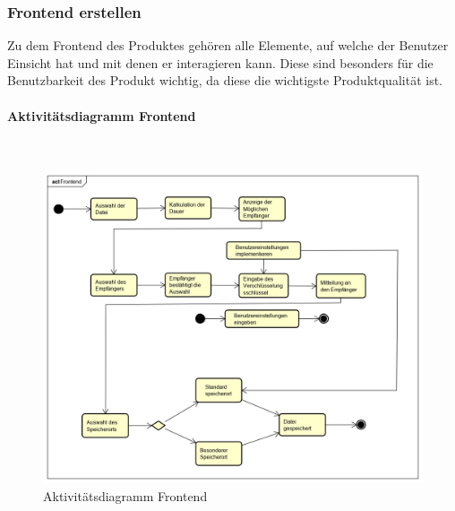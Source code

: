 \subsubsection{Frontend erstellen}
Zu dem Frontend des Produktes gehören alle Elemente, auf welche der Benutzer Einsicht hat und mit denen er interagieren kann. Diese sind besonders für die Benutzbarkeit des Produkt wichtig, da diese die wichtigste Produktqualität ist.
\paragraph{Aktivitätsdiagramm Frontend}\mbox{}\\
\begin{figure}[H]
	\centering
	\includegraphics[width= 0.9\linewidth]{diagramms/activity/Frontend.png}
	\caption{Aktivitätsdiagramm Frontend}
\end{figure}
\newpage
